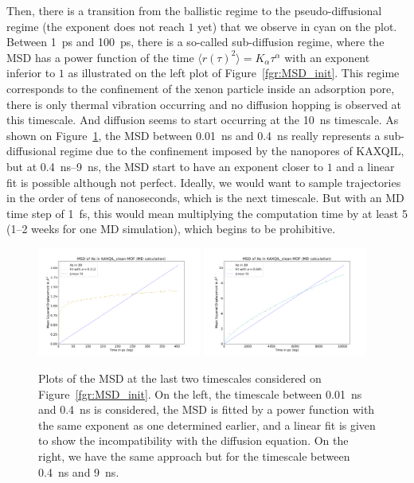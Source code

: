 \documentclass[main]{subfiles}
\begin{document}
Then, there is a transition from the ballistic regime to the pseudo-diffusional regime (the exponent does not reach $1$ yet) that we observe in cyan on the plot. Between \SI{1}{\ps} and \SI{100}{\ps}, there is a so-called sub-diffusion regime, where the MSD has a power function of the time $\langle {r(\tau)}^2 \rangle=K_\alpha\tau^\alpha$ with an exponent inferior to $1$ as illustrated on the left plot of Figure~\ref{fgr:MSD_init}. This regime corresponds to the confinement of the xenon particle inside an adsorption pore, there is only thermal vibration occurring and no diffusion hopping is observed at this timescale. And diffusion seems to start occurring at the \SI{10}{\ns} timescale. As shown on Figure~\ref{fgr:MSD_linear_init}, the MSD between \SI{0.01}{\ns} and \SI{0.4}{\ns} really represents a sub-diffusional regime due to the confinement imposed by the nanopores of KAXQIL, but at \SI{0.4}{\ns}--\SI{9}{\ns}, the MSD start to have an exponent closer to $1$ and a linear fit is possible although not perfect. Ideally, we would want to sample trajectories in the order of tens of nanoseconds, which is the next timescale. But with an MD time step of \SI{1}{\fs}, this would mean multiplying the computation time by at least 5 (1--2 weeks for one MD simulation), which begins to be prohibitive. 

\begin{figure}[ht]
  \centering
\includegraphics[width=0.48\textwidth]{figures/5-diffusion/MSD_Xe_coeff_KAXQIL_clean_1.pdf}
\includegraphics[width=0.48\textwidth]{figures/5-diffusion/MSD_Xe_coeff_KAXQIL_clean_2.pdf}
\caption{ Plots of the MSD at the last two timescales considered on Figure~\ref{fgr:MSD_init}. On the left, the timescale between \SI{0.01}{\ns} and \SI{0.4}{\ns} is considered, the MSD is fitted by a power function with the same exponent as one determined earlier, and a linear fit is given to show the incompatibility with the diffusion equation. On the right, we have the same approach but for the timescale between \SI{0.4}{\ns} and \SI{9}{\ns}. }\label{fgr:MSD_linear_init}
\end{figure}
\end{document}
